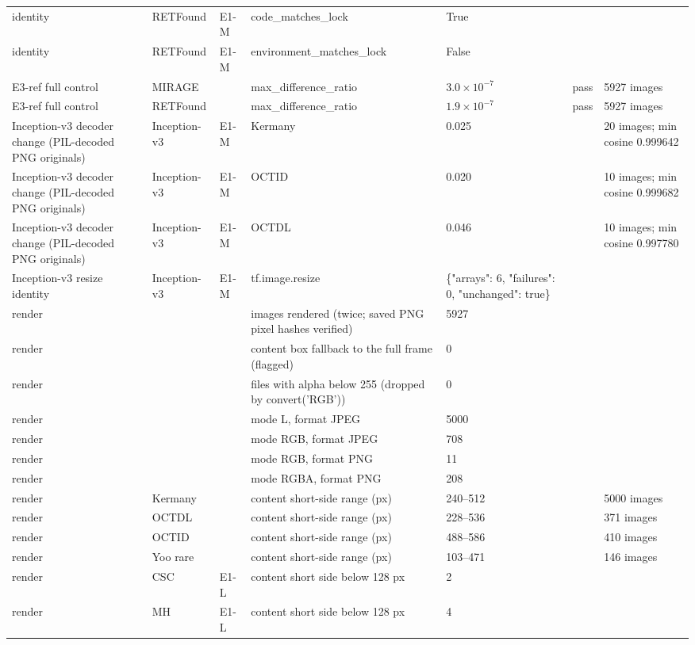 \begin{longtable}{@{}p{3.3cm}lp{1.5cm}p{3.6cm}p{2.2cm}p{1.6cm}p{3.2cm}@{}}
identity & RETFound & E1-M & code\_matches\_lock & True &  &  \\
identity & RETFound & E1-M & environment\_matches\_lock & False &  &  \\
E3-ref full control & MIRAGE &  & max\_difference\_ratio & $3.0\times10^{-7}$ & pass & 5927 images \\
E3-ref full control & RETFound &  & max\_difference\_ratio & $1.9\times10^{-7}$ & pass & 5927 images \\
Inception-v3 decoder change (PIL-decoded PNG originals) & Inception-v3 & E1-M & Kermany & 0.025 &  & 20 images; min cosine 0.999642 \\
Inception-v3 decoder change (PIL-decoded PNG originals) & Inception-v3 & E1-M & OCTID & 0.020 &  & 10 images; min cosine 0.999682 \\
Inception-v3 decoder change (PIL-decoded PNG originals) & Inception-v3 & E1-M & OCTDL & 0.046 &  & 10 images; min cosine 0.997780 \\
Inception-v3 resize identity & Inception-v3 & E1-M & tf.image.resize & \{"arrays": 6, "failures": 0, "unchanged": true\} &  &  \\
render &  &  & images rendered (twice; saved PNG pixel hashes verified) & 5927 &  &  \\
render &  &  & content box fallback to the full frame (flagged) & 0 &  &  \\
render &  &  & files with alpha below 255 (dropped by convert('RGB')) & 0 &  &  \\
render &  &  & mode L, format JPEG & 5000 &  &  \\
render &  &  & mode RGB, format JPEG & 708 &  &  \\
render &  &  & mode RGB, format PNG & 11 &  &  \\
render &  &  & mode RGBA, format PNG & 208 &  &  \\
render & Kermany &  & content short-side range (px) & 240--512 &  & 5000 images \\
render & OCTDL &  & content short-side range (px) & 228--536 &  & 371 images \\
render & OCTID &  & content short-side range (px) & 488--586 &  & 410 images \\
render & Yoo rare &  & content short-side range (px) & 103--471 &  & 146 images \\
render & CSC & E1-L & content short side below 128 px & 2 &  &  \\
render & MH & E1-L & content short side below 128 px & 4 &  &  \\

\end{longtable}
